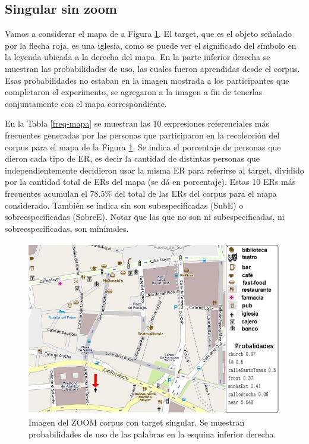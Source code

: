 \subsection{Singular sin zoom}
\label{sec:sinzoom}

Vamos a considerar el mapa de a Figura \ref{mapa-zoom1}. El target, que es el objeto se\~nalado por la flecha roja, es una iglesia, como se puede ver el significado del s\'imbolo en la leyenda ubicada a la derecha del mapa. En la parte inferior derecha se muestran las probabilidades de uso, las cuales fueron aprendidas desde el corpus. Esas probabilidades no estaban en la imagen mostrada a los participantes que completaron el experimento, se agregaron a la imagen a fin de tenerlas conjuntamente con el mapa correspondiente.

En la Tabla \ref{freq-mapa} se muestran las 10 expresiones referenciales m\'as frecuentes generadas por las personas que participaron 
en la recolecci\'on del corpus para el mapa de la Figura \ref{mapa-zoom1}. Se indica el porcentaje de personas que dieron cada tipo de ER, es decir la cantidad de distintas personas que independientemente decidieron usar la misma ER para referirse al target, dividido por la cantidad total de ERs del mapa (se d\'a en porcentaje). Estas 10 ERs m\'as frecuentes acumulan el 78.5\% del total de las ERs del corpus para el mapa considerado. Tambi\'en se indica sin son subespecificadas (SubE) o sobreespecificadas (SobreE). Notar que las que no son ni subespecificadas, ni sobreespecificadas, son minimales.\\


\begin{figure}
\begin{center}
\includegraphics[width=150mm]{images/corpus/mapa6-prob.png}
\caption{Imagen del ZOOM corpus con target singular. Se muestran probabilidades de uso de las palabras en la esquina inferior derecha.}
\label{mapa-zoom1}
\end{center}
\end{figure}

